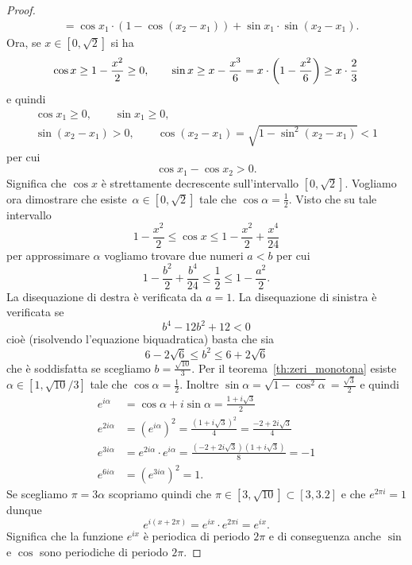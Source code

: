 \begin{proof}
\begin{align*}
&= \cos x_1 \cdot (1-\cos (x_2-x_1)) + \sin x_1 \cdot \sin (x_2-x_1).
\end{align*}
Ora, se $x\in [0,\sqrt 2]$ si ha
\begin{align*}
\cos x \ge 1 - \frac{x^2}{2}
\ge 0,
 \qquad
\sin x \ge x - \frac{x^3}{6}
= x \cdot {\left( 1-\frac{x^2}{6} \right)}
\ge x \cdot \frac 2 3\\
\end{align*}
e quindi
\begin{gather*}
\cos x_1 \ge 0, \qquad
\sin x_1 \ge 0, \\
\sin (x_2-x_1) > 0, \qquad
\cos (x_2-x_1) = \sqrt{1-\sin^2(x_2-x_1)} < 1
\end{gather*}
per cui
\[
  \cos x_1 - \cos x_2 > 0.
\]
Significa che $\cos x$ è strettamente
decrescente sull'intervallo $[0,\sqrt 2]$.
Vogliamo ora dimostrare che esiste\ $\alpha\in[0,\sqrt 2]$
tale che $\cos \alpha = \frac 1 2$.
Visto che su tale intervallo
\[
1-\frac{x^2}{2} \le \cos x \le 1 - \frac{x^2}{2} + \frac{x^4}{24}
\]
per approssimare $\alpha$ vogliamo trovare
due numeri $a<b$ per cui
\[
1 - \frac{b^2}{2} + \frac{b^4}{24}
\le \frac 1 2
\le 1-\frac{a^2}{2}.
\]
La disequazione di destra è verificata da $a=1$.
La disequazione di sinistra è verificata se
\[
    b^4 - 12 b^2 + 12 < 0
\]
cioè (risolvendo l'equazione biquadratica) basta che sia
\[
  6 - 2\sqrt 6 \le
  b^2 \le 6 + 2\sqrt 6
\]
che è soddisfatta se scegliamo $b = \frac{\sqrt{10}}{3}$.
Per il teorema~\ref{th:zeri_monotona} esiste
$\alpha\in [1,\sqrt{10}/3]$
tale che $\cos \alpha = \frac 1 2$.
Inoltre $\sin \alpha=\sqrt{1-\cos^2 \alpha}= \frac{\sqrt{3}}{2}$
e quindi
\begin{align*}
  e^{i\alpha} &= \cos \alpha + i \sin \alpha = \frac{1+ i\sqrt 3}{2}\\
  e^{2i\alpha} &= (e^{i\alpha})^2
  = \frac{(1+i\sqrt 3)^2}{4}
  = \frac{-2+2i\sqrt 3}{4}\\
  e^{3i\alpha} &= e^{2i\alpha}\cdot e^{i\alpha}
  = \frac{(-2+2i\sqrt 3)(1+i\sqrt 3)}{8}
  = -1 \\
  e^{6i\alpha} &= (e^{3i\alpha})^2 = 1.
\end{align*}
Se scegliamo $\pi = 3\alpha$ scopriamo quindi
che $\pi\in [3,\sqrt{10}]
\subset [3,3.2]$
e che
$e^{2\pi i} = 1$ dunque
\[
  e^{i(x+2\pi)} = e^{ix} \cdot e^{2\pi i} = e^{ix}.
\]
Significa che la funzione $e^{ix}$
è periodica di periodo $2\pi$ e di conseguenza anche
$\sin$ e $\cos$ sono periodiche di periodo $2\pi$.


\end{proof}
